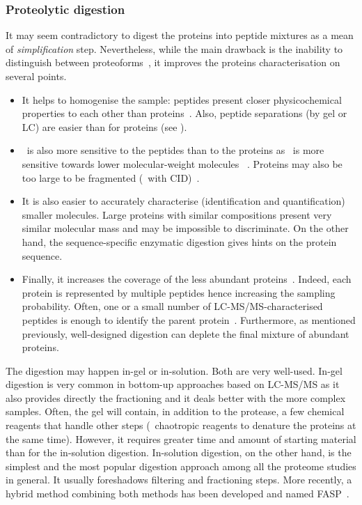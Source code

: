 \subsubsection{Proteolytic digestion}
It may seem contradictory to digest the proteins into peptide mixtures as a mean
of \emph{simplification} step. Nevertheless, while the main drawback is the inability
to distinguish between proteoforms~, it improves the proteins
characterisation on several points.
\begin{itemize}
    \item It helps to homogenise the sample: peptides present closer
        physicochemical properties to each other than proteins~.
        Also, peptide separations (by gel or \gls{LC}) are easier than
        for proteins (see ).
    \item \ms\ is also more sensitive to the peptides than to the proteins as
        \ms\ is more sensitive towards lower molecular-weight molecules~%
        . Proteins may also be too large to be
        fragmented (\eg\ with \gls{CID})~.
    \item It is also easier to accurately characterise (identification and
        quantification) smaller molecules. Large proteins with similar
        compositions present very similar molecular mass and may be impossible
        to discriminate. On the other hand, the sequence-specific enzymatic
        digestion gives hints on the protein sequence.
    \item Finally, it increases the coverage of the less abundant proteins~.
        Indeed, each protein is represented by multiple
        peptides hence increasing the sampling probability. Often, one or a small
        number of \gls{LC-MS/MS}-characterised peptides is enough to identify the
        parent protein~.
        Furthermore, as mentioned previously, well-designed digestion can deplete
        the final mixture of abundant proteins.
\end{itemize}

The digestion may happen in-gel or in-solution. Both are very well-used.
In-gel digestion is very common in bottom-up approaches based on \gls{LC-MS/MS}
as it also provides directly the fractioning and it deals better with the more
complex samples. Often, the gel will contain, in addition to the protease, a few
chemical reagents that handle other steps (\eg\ chaotropic reagents to denature
the proteins at the same time). However, it requires greater time and amount of
starting material than for the in-solution digestion. In-solution digestion,
on the other hand, is the simplest and the most popular
digestion approach among all the proteome studies in general. It usually
foreshadows filtering and fractioning steps. More recently, a hybrid method
combining both methods has been developed and
named \acrfull{FASP}~.

